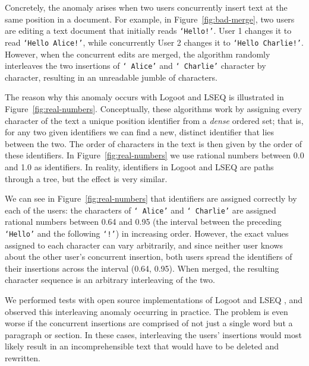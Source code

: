 \documentclass[sigconf]{acmart}
\begin{document}
Concretely, the anomaly arises when two users concurrently insert text at the same position in a document.
For example, in Figure~\ref{fig:bad-merge}, two users are editing a text document that initially reads \texttt{`Hello!'}.
User 1 changes it to read \texttt{`Hello Alice!'}, while concurrently User 2 changes it to \texttt{`Hello Charlie!'}.
However, when the concurrent edits are merged, the algorithm randomly interleaves the two insertions of \texttt{`~Alice'} and \texttt{`~Charlie'} character by character, resulting in an unreadable jumble of characters.

The reason why this anomaly occurs with Logoot and LSEQ is illustrated in Figure~\ref{fig:real-numbers}.
Conceptually, these algorithms work by assigning every character of the text a unique position identifier from a \emph{dense} ordered set; that is, for any two given identifiers we can find a new, distinct identifier that lies between the two.
The order of characters in the text is then given by the order of these identifiers.
In Figure~\ref{fig:real-numbers} we use rational numbers between 0.0 and 1.0 as identifiers.
In reality, identifiers in Logoot and LSEQ are paths through a tree, but the effect is very similar.

We can see in Figure~\ref{fig:real-numbers} that identifiers are assigned correctly by each of the users: the characters of \texttt{` Alice'} and \texttt{` Charlie'} are assigned rational numbers between 0.64 and 0.95 (the interval between the preceding \texttt{`Hello'} and the following \texttt{`!'}) in increasing order.
However, the exact values assigned to each character can vary arbitrarily, and since neither user knows about the other user's concurrent insertion, both users spread the identifiers of their insertions across the interval (0.64, 0.95).
When merged, the resulting character sequence is an arbitrary interleaving of the two.

We performed tests with open source implementations of Logoot \cite{AhmedNacer:2011ke,ReplicationBenchmark} and LSEQ \cite{LSEQTree,Nedelec:2016eo}, and observed this interleaving anomaly occurring in practice.
The problem is even worse if the concurrent insertions are comprised of not just a single word but a paragraph or section.
In these cases, interleaving the users' insertions would most likely result in an incomprehensible text that would have to be deleted and rewritten.

\end{document}

